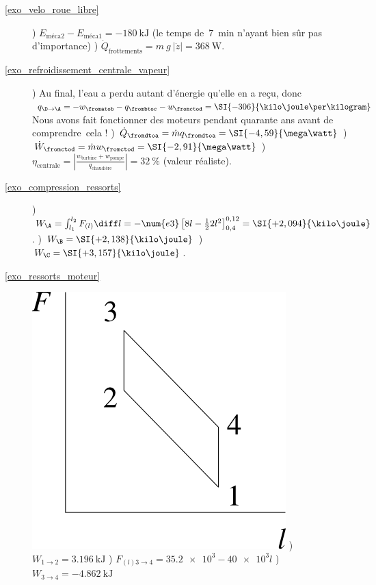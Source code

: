 \begin{description}
	\item[\ref{exo_velo_roue_libre}]
				) $E_{\text{méca}2} - E_{\text{méca}1} = \SI{-180}{\kilo\joule}$ (le temps de~\SI{7}{\minute} n’ayant bien sûr pas d’importance)
				) $\dot Q_{\text{frottements}} = m \ g \ \left|\dot z\right| = \SI{368}{\watt}$.
	\item[\ref{exo_refroidissement_centrale_vapeur}] 	
				) Au final, l’eau a perdu autant d’énergie qu’elle en a reçu, donc $q_{\D \to \A} = - w_\fromatob - q_\frombtoc - w_\fromctod = \SI{-306}{\kilo\joule\per\kilogram} $ Nous avons fait fonctionner des moteurs pendant quarante ans avant de comprendre~cela !
				) $\dot Q_\fromdtoa = \dot m q_\fromdtoa = \SI{-4,59}{\mega\watt}$
				) $\dot W_\fromctod = \dot m w_\fromctod = \SI{-2,91}{\mega\watt}$
				) $\eta_{\text{centrale}} = \left|\frac{w_{\text{turbine}} + w_{\text{pompe}}}{q_{\text{chaudière}}}\right| = \SI{32}{\percent}$ (valeur réaliste).
	\item [\ref{exo_compression_ressorts}]
				) $W_\A = \int_{l_1}^{l_2} F_{(l)} \diff l = - \num{e3} \left[ 8 l - \frac{1}{2} 2 l^2 \right]_{0,4}^{0,12} = \SI{+2,094}{\kilo\joule}$.
				) $W_\B = \SI{+2,138}{\kilo\joule}$
				) $W_\C = \SI{+3,157}{\kilo\joule}$.
	\item [\ref{exo_ressorts_moteur}]
				\includegraphics[width=\solutiondiagramwidth]{images/exo_sol_fl_ressorts_moteur.png}
				) $W_{1 \to 2} = \SI{+3,196}{\kilo\joule}$
				) $F_{(l) 3 \to 4} = \num{35,2e3} - \num{40e3} l$
				) $W_{3 \to 4} = \SI{-4,862}{\kilo\joule}$

\end{description}
